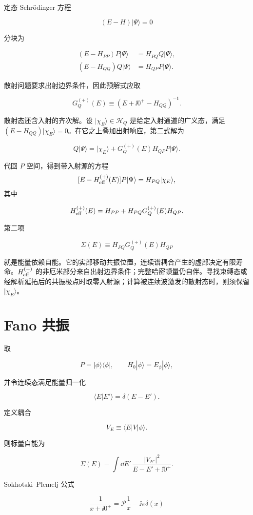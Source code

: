 定态 Schr\"odinger 方程

\[
(E-H)|\Psi\rangle=0
\]

分块为

\begin{align*}
(E-H_{PP})P|\Psi\rangle
&=H_{PQ}Q|\Psi\rangle,
\\
(E-H_{QQ})Q|\Psi\rangle
&=H_{QP}P|\Psi\rangle.
\end{align*}

散射问题要求出射边界条件，因此预解式应取

\[
G_Q^{(+)}(E)
\equiv(E+\ii0^+-H_{QQ})^{-1}.
\]

散射态还含入射的齐次解。设 $|\chi_E\rangle\in\mathcal H_Q$ 是给定入射通道的广义态，满足 $(E-H_{QQ})|\chi_E\rangle=0$。在它之上叠加出射响应，第二式解为

\[
Q|\Psi\rangle
=|\chi_E\rangle+G_Q^{(+)}(E)H_{QP}P|\Psi\rangle.
\]

代回 $P$ 空间，得到带入射源的方程
\[
 [E-H_{\rm eff}^{(+)}(E)]P|\Psi\rangle=H_{PQ}|\chi_E\rangle,
\]
其中

\begin{equation}
H_{\rm eff}^{(+)}(E)
=H_{PP}
+H_{PQ}G_Q^{(+)}(E)H_{QP}.
\label{eq:feshbach-effective}
\end{equation}

第二项

\[
\Sigma(E)
\equiv H_{PQ}G_Q^{(+)}(E)H_{QP}
\]

就是能量依赖自能。它的实部移动共振位置，连续谱耦合产生的虚部决定有限寿命。$H_{\rm eff}^{(+)}$ 的非厄米部分来自出射边界条件；完整哈密顿量仍自伴。寻找束缚态或经解析延拓后的共振极点时取零入射源；计算被连续波激发的散射态时，则须保留 $|\chi_E\rangle$。

\section{Fano 共振}
取

\[
P=|\phi\rangle\langle\phi|,
\qquad
H_0|\phi\rangle=E_\phi|\phi\rangle,
\]

并令连续态满足能量归一化

\[
\langle E|E'\rangle=\delta(E-E').
\]

定义耦合

\[
V_E\equiv\langle E|V|\phi\rangle.
\]

则标量自能为

\[
\Sigma(E)
=\int\dd E'\,
\frac{|V_{E'}|^2}{E-E'+\ii0^+}.
\]

Sokhotski--Plemelj 公式

\[
\frac1{x+\ii0^+}
=\mathcal P\frac1x-\ii\pi\delta(x)
\]

